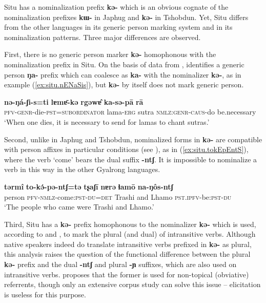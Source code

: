 \documentclass[oneside,a4paper,11pt]{article}
\newcommand{\ipa}[1]{\textbf{\phon\mbox{#1}}} %
\newcommand{\refb}[1]{(\ref{#1})}
\begin{document}
   Situ has a nominalization prefix \ipa{kə-} which is an obvious cognate of the  nominalization prefixes \ipa{kɯ-} in Japhug and \ipa{kə-} in Tshobdun. Yet, Situ differs from the other languages in its generic person marking system and in its nominalization patterns. Three major differences are observed.

First, there is no generic person  marker \ipa{kə-} homophonous with the nominalization prefix in Situ.  On the basis of data from \citet[47-9]{wei01ka}, \citet[243-4]{sun14generic} identifies a generic person \ipa{ŋa-} prefix which can coalesce as \ipa{ka-} with the nominalizer \ipa{kə-}, as in example \refb{ex:situ.nENaSis}, but \ipa{kə-} by itself does not mark generic person. 

 \begin{exe}
\ex \label{ex:situ.nENaSis}
\gll
\ipa{nə-ŋá-ʃi-s=ti}  	\ipa{lɐmɐ̄-kə}  	\ipa{rgəwɐ̂}  	\ipa{ka-sə-pā}  	\ipa{rā}  \\
\textsc{pfv-genr}-die-\textsc{pst=subordinator} lama-\textsc{erg} sutra \textsc{nmlz:genr-caus}-do be.necessary \\
\glt `When one dies, it is necessary to send for lamas to chant sutras.'
  \end{exe}
 
Second, unlike in Japhug and Tshobdun, nominalized forms in \ipa{kə-} are compatible with person affixes in particular conditions (see \citealt[11-12]{jacksonlin07}), as in \refb{ex:situ.tokEpEntS}, where the verb `come' bears the dual suffix \ipa{-ntʃ}. It is impossible to nominalize a verb in this way in the other Gyalrong languages.

 \begin{exe}
\ex \label{ex:situ.tokEpEntS}
\gll
\ipa{tərmî}  	\ipa{to-kə́-pə-ntʃ=tə}  	\ipa{tʂaʃī}  	\ipa{nɐrə}  	\ipa{ɬamō}  	\ipa{na-ŋôs-ntʃ}  	\\
person \textsc{pfv-nmlz}-come:\textsc{pst}-\textsc{du=det} Trashi and Lhamo \textsc{pst.ipfv}-be:\textsc{pst}-\textsc{du} \\
\glt `The people who came were Trashi and Lhamo.'
  \end{exe}

Third, Situ has a   \ipa{kə-} prefix homophonous to the nominalizer \ipa{kə-} which is used, according to \citealt[218]{linxr93jiarong} and \citet[163]{lin09phd}, to mark the plural (and dual) of intransitive verbs. Although native speakers indeed do translate intransitive verbs prefixed in \ipa{kə-} as plural, this analysis raises the question of the functional difference between the plural \ipa{kə-} prefix and the dual \ipa{-ntʃ}  and plural \ipa{-ɲ} suffixes, which are also used on intransitive verbs. \citet[101-102]{jacques12agreement} proposes that the former is used for non-topical (obviative) referrents, though only an extensive corpus study can solve this issue -- elicitation is useless for this purpose.
\end{document}
